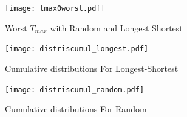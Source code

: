 \documentclass[a4paper,10pt]{report}
\begin{document}
\begin{figure}[H]
\hspace*{-3cm}
\centering
\texttt{[image: tmax0worst.pdf]}%
\caption{Worst $T_{max}$ with Random and Longest Shortest}
\end{figure}


\begin{figure}[H]
\hspace*{-3cm}
\centering
\texttt{[image: distriscumul\_longest.pdf]}%
\caption{Cumulative distributions For Longest-Shortest}
\end{figure}

\begin{figure}[H]
\hspace*{-3cm}
\centering
\texttt{[image: distriscumul\_random.pdf]}%
\caption{Cumulative distributions For Random}
\end{figure}




\end{document}
